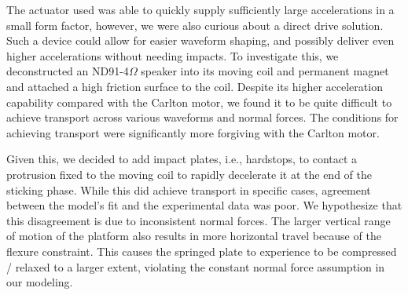 The actuator used was able to quickly supply sufficiently large accelerations in a small form factor, however, we were also curious about a direct drive solution.
%
Such a device could allow for easier waveform shaping, and possibly deliver even higher accelerations without needing impacts.
% 
To investigate this, we deconstructed an ND91-4$\Omega$ speaker into its moving coil and permanent magnet and attached a high friction surface to the coil.
%
Despite its higher acceleration capability compared with the Carlton motor, we found it to be quite difficult to achieve transport across  various waveforms and normal forces.
%
The conditions for achieving transport were significantly more forgiving with the Carlton motor.

Given this, we decided to add impact plates, i.e., hardstops, to contact a protrusion fixed to the moving coil to rapidly decelerate it at the end of the sticking phase.
%
While this did achieve transport in specific cases, agreement between the model's fit and the experimental data was poor. 
%
We hypothesize that this disagreement is due to inconsistent normal forces.
%
The larger vertical range of motion of the platform also results in more horizontal travel because of the flexure constraint.
%
This causes the springed plate to experience to be compressed / relaxed to a larger extent, violating the constant normal force assumption in our modeling.